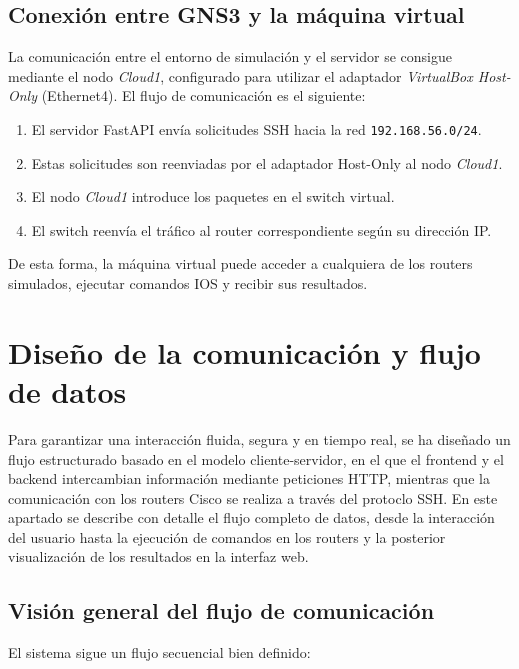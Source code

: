 \subsection*{Conexión entre GNS3 y la máquina virtual}

La comunicación entre el entorno de simulación y el servidor se consigue mediante el nodo \textit{Cloud1}, configurado para utilizar el adaptador \textit{VirtualBox Host-Only} (Ethernet4). El flujo de comunicación es el siguiente:

\begin{enumerate}
    \item El servidor FastAPI envía solicitudes SSH hacia la red \texttt{192.168.56.0/24}.
    \item Estas solicitudes son reenviadas por el adaptador Host-Only al nodo \textit{Cloud1}.
    \item El nodo \textit{Cloud1} introduce los paquetes en el switch virtual.
    \item El switch reenvía el tráfico al router correspondiente según su dirección IP.
\end{enumerate}

De esta forma, la máquina virtual puede acceder a cualquiera de los routers simulados, ejecutar comandos IOS y recibir sus resultados.

\section{Diseño de la comunicación y flujo de datos}

Para garantizar una interacción fluida, segura y en tiempo real, se ha diseñado un flujo estructurado basado en el modelo cliente-servidor, en el que el frontend y el backend intercambian información mediante peticiones HTTP, mientras que la comunicación con los routers Cisco se realiza a través del protoclo SSH. En este apartado se describe con detalle el flujo completo de datos, desde la interacción del usuario hasta la ejecución de comandos en los routers y la posterior visualización de los resultados en la interfaz web.

\subsection*{Visión general del flujo de comunicación}

El sistema sigue un flujo secuencial bien definido:

